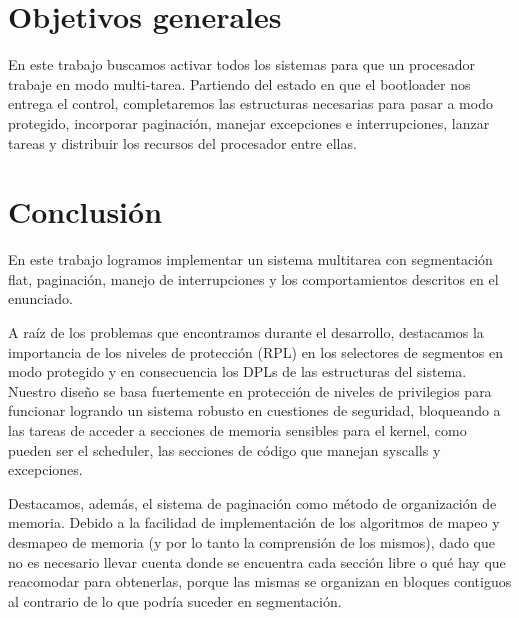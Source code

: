\documentclass[a4paper]{article}
\begin{document}
\thispagestyle{empty}

\maketitle
\newpage

\thispagestyle{empty}
\vfill


\thispagestyle{empty}
\vspace{3cm}
\tableofcontents
\newpage


\newpage

\section{Objetivos generales}

En este trabajo buscamos activar todos los sistemas para que un procesador trabaje en modo multi-tarea. Partiendo del estado en que el bootloader nos entrega el control, completaremos las estructuras necesarias para pasar a modo protegido, incorporar paginación, manejar excepciones e interrupciones, lanzar tareas y distribuir los recursos del procesador entre ellas.

\newpage



\newpage

\section{Conclusión}

En este trabajo logramos implementar un sistema multitarea con segmentación flat, paginación, manejo de interrupciones y los comportamientos descritos en el enunciado.

A raíz de los problemas que encontramos durante el desarrollo, destacamos la importancia de los niveles de protección (RPL) en los selectores de segmentos en modo protegido
y en consecuencia los DPLs de las estructuras del sistema. 
Nuestro diseño se basa fuertemente en protección de niveles de privilegios para funcionar logrando un sistema robusto en cuestiones de seguridad, bloqueando a las tareas de acceder a secciones de memoria sensibles para el kernel, como pueden ser el scheduler, las secciones de código que manejan syscalls y excepciones.

Destacamos, además, el sistema de paginación como método de organización de memoria. Debido a la facilidad de implementación de los algoritmos de mapeo y desmapeo de memoria (y por lo tanto la comprensión de los mismos), dado que no es necesario llevar cuenta donde se encuentra cada sección libre o qué hay que reacomodar para obtenerlas, porque las mismas se organizan en bloques contiguos al contrario de lo que podría suceder en segmentación.
\end{document}
